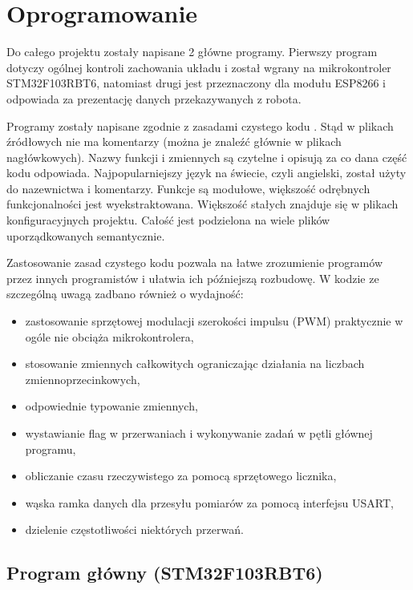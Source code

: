 \documentclass[a4paper,12pt,twoside,openany]{report}
\begin{document}
\chapter{Oprogramowanie}

Do całego projektu zostały napisane 2 główne programy. Pierwszy program dotyczy ogólnej kontroli zachowania układu i został wgrany na mikrokontroler STM32F103RBT6, natomiast drugi jest przeznaczony dla modułu ESP8266 i odpowiada za prezentację danych przekazywanych z robota. 

Programy zostały napisane zgodnie z zasadami czystego kodu \cite{cleancode}. Stąd w plikach źródłowych nie ma komentarzy (można je znaleźć głównie w plikach nagłówkowych). Nazwy funkcji i zmiennych są czytelne i opisują za co dana część kodu odpowiada. Najpopularniejszy język na świecie, czyli angielski, został użyty do nazewnictwa i komentarzy. Funkcje są modułowe, większość odrębnych funkcjonalności jest wyekstraktowana. Większość stałych znajduje się w plikach konfiguracyjnych projektu. Całość jest podzielona na wiele plików uporządkowanych semantycznie. 

Zastosowanie zasad czystego kodu pozwala na łatwe zrozumienie programów przez innych programistów i ułatwia ich późniejszą rozbudowę. W kodzie ze szczególną uwagą zadbano również o wydajność:
\begin{itemize}
\item zastosowanie sprzętowej modulacji szerokości impulsu (PWM) praktycznie w ogóle nie obciąża mikrokontrolera,
\item stosowanie zmiennych całkowitych ograniczając działania na liczbach zmiennoprzecinkowych,
\item odpowiednie typowanie zmiennych,
\item wystawianie flag w przerwaniach i wykonywanie zadań w pętli głównej programu,
\item obliczanie czasu rzeczywistego za pomocą sprzętowego licznika,
\item wąska ramka danych dla przesyłu pomiarów za pomocą interfejsu USART,
\item dzielenie częstotliwości niektórych przerwań.
\end{itemize}

\section{Program główny (STM32F103RBT6)}
\end{document}

